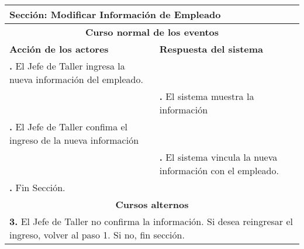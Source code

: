 \documentclass[12pt]{extarticle}
\newcounter{step}
\newcommand\inc{\stepcounter{step}\textbf{\thestep. }}
\begin{document}
	\begin{longtable}{ |p{8cm}|p{8cm}| }
		\hline
		\multicolumn{2}{|p{16cm}|}{\textbf{Sección}: Modificar Información de Empleado}\\
		\hline
		\multicolumn{2}{|c|}{\textbf{Curso normal de los eventos}}\\
		\hline
		\textbf{Acción de los actores} & \textbf{Respuesta del sistema}\\
		\hline
			\inc El Jefe de Taller ingresa la nueva información del empleado.& \\
			\hline
		    & \inc El sistema muestra la información\\
			\hline
			\inc El Jefe de Taller confima el ingreso de la nueva información &\\
			\hline
		    & \inc El sistema vincula la nueva información con el empleado.\\
			\hline
			\inc Fin Sección. & \\
		\hline
		\multicolumn{2}{|c|}{\textbf{Cursos alternos}}\\
		\hline
        \multicolumn{2}{|p{16cm}|}{\textbf{3. }El Jefe de Taller no confirma la información. Si desea reingresar el ingreso, volver al paso 1. Si no, fin sección.}\\
		\hline
	\end{longtable}
\end{document}
